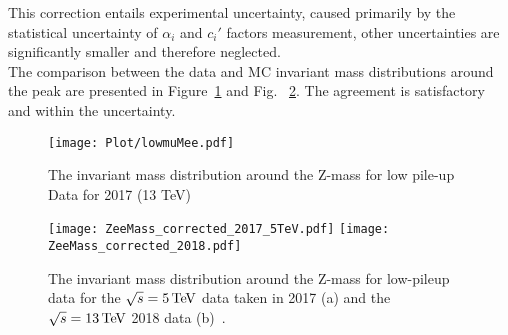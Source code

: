This correction entails experimental uncertainty, caused primarily by the statistical uncertainty of $\alpha_i$ and $c_i'$ factors measurement, other uncertainties are significantly smaller and therefore neglected.\\
The comparison between the data and MC invariant mass distributions around the \Zee peak are presented in Figure~\ref{fig:mee-lowmu-data-vs-MC} and Fig. ~\ref{fig:alpha-highmu-lowmu-thresh-corr}. The agreement is satisfactory and within the uncertainty.

\begin{figure}[H]
	\center
	\texttt{[image: Plot/lowmuMee.pdf]}
	\caption{The invariant mass distribution around the Z-mass for low pile-up Data for 2017 (13 TeV)~\cite{int_note_electrons}}
	\label{fig:mee-lowmu-data-vs-MC}
\end{figure}
\begin{figure}[H]
\begin{center}
    {{\texttt{[image: ZeeMass\_corrected\_2017\_5TeV.pdf]}
    }}
    {{\texttt{[image: ZeeMass\_corrected\_2018.pdf]}
    }}
    \caption{ The invariant mass distribution around the Z-mass for low-pileup data for the $\sqrt{s}=5\,\text{Te\kern -0.1em V}$ data taken in 2017 (a) and the $\sqrt{s}=13\,\text{Te\kern -0.1em V}$ 2018 data (b)~\cite{int_note_electrons}.}
    \label{fig:alpha-highmu-lowmu-thresh-corr}
\end{center}
\end{figure}

\clearpage
	
